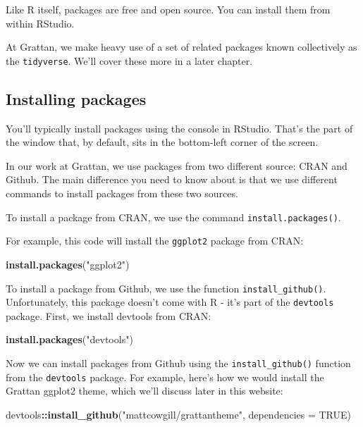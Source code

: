\documentclass[]{book}
\newenvironment{Shaded}{\begin{snugshade}}{\end{snugshade}}
\newcommand{\DataTypeTok}[1]{\textcolor[rgb]{0.13,0.29,0.53}{#1}}
\newcommand{\KeywordTok}[1]{\textcolor[rgb]{0.13,0.29,0.53}{\textbf{#1}}}
\newcommand{\NormalTok}[1]{#1}
\newcommand{\OperatorTok}[1]{\textcolor[rgb]{0.81,0.36,0.00}{\textbf{#1}}}
\newcommand{\OtherTok}[1]{\textcolor[rgb]{0.56,0.35,0.01}{#1}}
\newcommand{\StringTok}[1]{\textcolor[rgb]{0.31,0.60,0.02}{#1}}
\begin{document}
Like R itself, packages are free and open source. You can install them from within RStudio.

At Grattan, we make heavy use of a set of related packages known collectively as the \texttt{tidyverse}. We'll cover these more in a later chapter.

\hypertarget{installing-packages}{%
\subsection{Installing packages}\label{installing-packages}}

You'll typically install packages using the console in RStudio. That's the part of the window that, by default, sits in the bottom-left corner of the screen.

In our work at Grattan, we use packages from two different source: CRAN and Github. The main difference you need to know about is that we use different commands to install packages from these two sources.

To install a package from CRAN, we use the command \texttt{install.packages()}.

For example, this code will install the \texttt{ggplot2} package from CRAN:

\begin{Shaded}
\begin{Highlighting}[]
\KeywordTok{install.packages}\NormalTok{(}\StringTok{"ggplot2"}\NormalTok{)}
\end{Highlighting}
\end{Shaded}

To install a package from Github, we use the function \texttt{install\_github()}. Unfortunately, this package doesn't come with R - it's part of the \texttt{devtools} package. First, we install devtools from CRAN:

\begin{Shaded}
\begin{Highlighting}[]
\KeywordTok{install.packages}\NormalTok{(}\StringTok{"devtools"}\NormalTok{)}
\end{Highlighting}
\end{Shaded}

Now we can install packages from Github using the \texttt{install\_github()} function from the \texttt{devtools} package. For example, here's how we would install the Grattan ggplot2 theme, which we'll discuss later in this website:

\begin{Shaded}
\begin{Highlighting}[]
\NormalTok{devtools}\OperatorTok{::}\KeywordTok{install_github}\NormalTok{(}\StringTok{"mattcowgill/grattantheme"}\NormalTok{, }\DataTypeTok{dependencies =} \OtherTok{TRUE}\NormalTok{)}
\end{Highlighting}
\end{Shaded}
\end{document}
